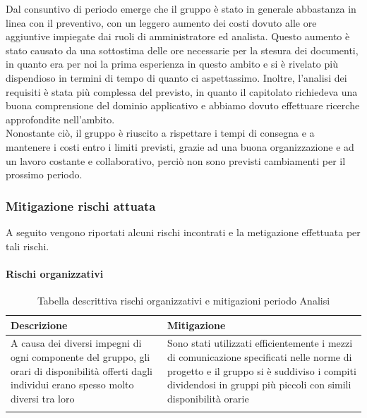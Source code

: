 Dal consuntivo di periodo emerge che il gruppo è stato in generale abbastanza in linea con il preventivo,
 con un leggero aumento dei costi dovuto alle ore aggiuntive impiegate dai ruoli di amministratore ed analista.
Questo aumento è stato causato da una sottostima delle ore necessarie per la stesura dei documenti,
 in quanto era per noi la prima esperienza in questo ambito e si è rivelato più dispendioso in termini di tempo di quanto ci aspettassimo.
Inoltre, l'analisi dei requisiti è stata più complessa del previsto, in quanto il capitolato richiedeva una buona comprensione
 del dominio applicativo e abbiamo dovuto effettuare ricerche approfondite nell'ambito.\\
Nonostante ciò, il gruppo è riuscito a rispettare i tempi di consegna e a mantenere i costi entro i limiti previsti, grazie ad una buona organizzazione
 e ad un lavoro costante e collaborativo, perciò non sono previsti cambiamenti per il prossimo periodo.\\

\newpage
\subsubsection{Mitigazione rischi attuata}\label{sec:consuntivo:analisi:mitigazione}

A seguito vengono riportati alcuni rischi incontrati e la metigazione effettuata per tali rischi.\\

\paragraph{Rischi organizzativi}

\begin{center}


    \begin{xltabular}{\textwidth}{| X | X |}
                
        \textbf{\color{white} Descrizione} & \textbf{\color{white} Mitigazione}\\ 
        \endhead
    
        A causa dei diversi impegni di ogni componente del gruppo, gli orari di disponibilità offerti dagli individui erano spesso molto diversi tra loro &
        Sono stati utilizzati efficientemente i mezzi di comunicazione specificati nelle norme di progetto e il gruppo si è suddiviso i compiti dividendosi in gruppi più piccoli
        con simili disponibilità orarie \\
        \hline
            
        \caption{Tabella descrittiva rischi organizzativi e mitigazioni periodo Analisi}\label{tab:rischi_organizzativi_analisi}
    \end{xltabular}
\end{center}

